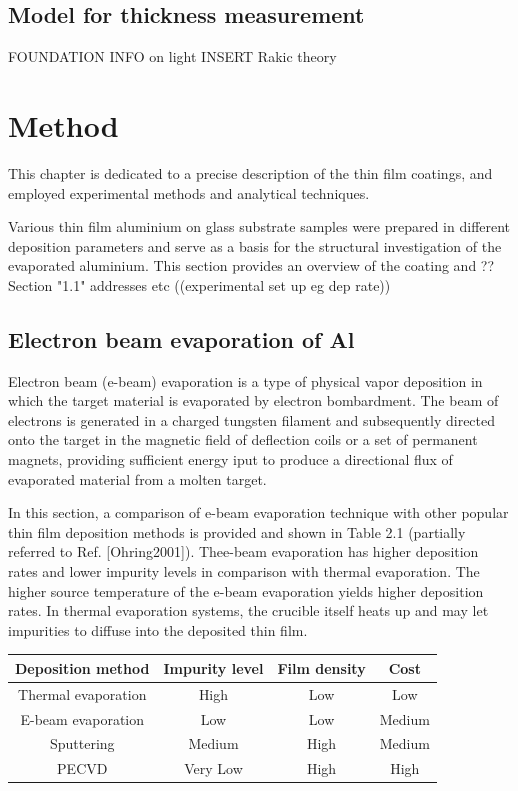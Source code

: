 \documentclass{article}
\begin{document}
\subsection{Model for thickness measurement}

FOUNDATION INFO on light
INSERT Rakic theory 




\section{Method}
This chapter is dedicated to a precise description of the thin film coatings, and employed
experimental methods and analytical techniques.

Various thin film aluminium on glass substrate samples were prepared in different deposition parameters
and serve as a basis for the structural investigation of the evaporated aluminium.
This section provides an overview of the coating and ??
Section "1.1" addresses etc
((experimental set up eg dep rate))


\subsection{Electron beam evaporation of Al}

Electron beam (e-beam) evaporation is a type of physical vapor deposition in which 
the target material is evaporated by electron bombardment.
The beam of electrons is generated in a charged tungsten filament and subsequently
directed onto the target in the magnetic field of deflection coils or a set of
permanent magnets, providing sufficient energy iput to produce a directional
flux of evaporated material from a molten target.

In this section, a comparison of e-beam evaporation technique with other popular thin
 film deposition methods is provided and shown in Table 2.1 (partially referred to 
 Ref. [Ohring2001]). Thee-beam evaporation has higher deposition rates and lower 
 impurity levels in comparison with thermal evaporation. The higher source temperature
of the e-beam evaporation yields higher deposition rates. In thermal evaporation 
systems, the crucible itself heats up and may let impurities to diffuse into the
deposited thin film.

\begin{table}[]
\centering
    \begin{tabular}{|c|c|c|c|}
    \hline
    Deposition method   & Impurity level & Film density & Cost   \\ \hline
    Thermal evaporation & High           & Low          & Low    \\ \hline
    E-beam evaporation  & Low            & Low          & Medium \\ \hline
    Sputtering          & Medium         & High         & Medium \\ \hline
    PECVD               & Very Low       & High         & High   \\ \hline
    \end{tabular}
    \end{table}
\end{document}
